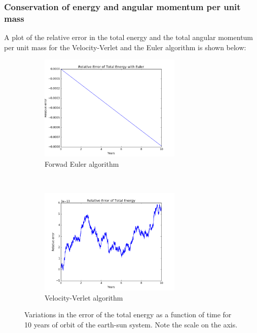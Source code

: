 \documentclass[a4paper, 10pt]{article}
\begin{document}
\subsubsection{Conservation of energy and angular momentum per unit mass}
A plot of the relative error in the total energy and the total angular momentum per unit mass for the Velocity-Verlet and the Euler algorithm is shown below:
\begin{figure}[t!]
    \centering
    \begin{subfigure}[t]{0.5\textwidth}
        \centering
        \includegraphics[height=2.0in]{relErrEnESEuler.png}
        \caption{Forwad Euler algorithm}
    \end{subfigure}%
    ~ 
    \begin{subfigure}[t]{0.5\textwidth}
        \centering
        \includegraphics[height=2.0in]{relErEnES.png}
        \caption{Velocity-Verlet algorithm}
    \end{subfigure}
    \caption{Variations in the error of the total energy as a function of time for 10 years of orbit of the earth-sun system. Note the scale on the axis.}
\end{figure}
\end{document}
